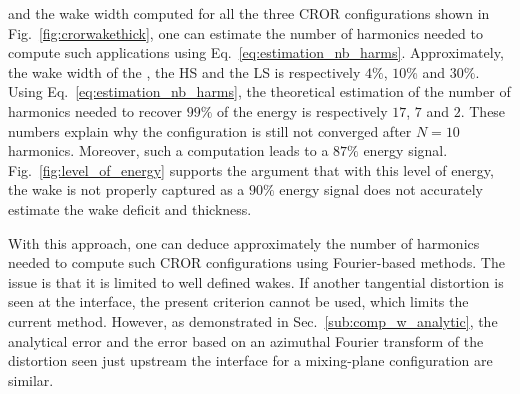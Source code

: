 and the wake width computed
for all the three CROR configurations shown in Fig.~\ref{fig:crorwakethick},
one can estimate the number of harmonics needed to compute such
applications using Eq.~\eqref{eq:estimation_nb_harms}. 
Approximately, the wake width
of the \aipx, the HS \mockup and the LS \mockup is respectively
$4\%$, $10\%$ and $30\%$. 
Using Eq.~\eqref{eq:estimation_nb_harms},
the theoretical estimation of the number of harmonics needed 
to recover $99\%$ of the energy is respectively
$17$, $7$ and $2$. These numbers explain why the 
\aipx configuration is still not converged after $N=10$
harmonics. Moreover, such a computation leads to a
$87\%$ energy signal. Fig.~\ref{fig:level_of_energy}
supports the argument that with this level of energy, the wake
is not properly captured as a $90\%$ energy signal
does not accurately estimate the wake deficit and thickness.

With this approach, one can deduce approximately
the number of harmonics needed to compute such CROR
configurations using Fourier-based methods. The issue is that it is limited to
well defined wakes. If another tangential
distortion is seen at the interface, the present
criterion cannot be used, which limits the current
method. However, as demonstrated in Sec.~\ref{sub:comp_w_analytic},
the analytical error and the error based on an
azimuthal Fourier transform of the distortion
seen just upstream the interface for a mixing-plane
configuration are similar. 


